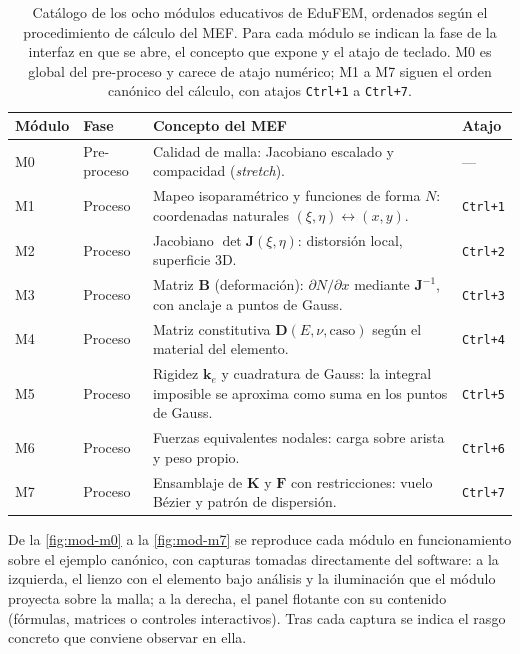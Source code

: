 \begin{table}[htbp]
\centering
\caption[Catálogo de los ocho módulos educativos de EduFEM.]{Catálogo de los ocho módulos educativos de EduFEM, ordenados según el procedimiento de cálculo del MEF. Para cada módulo se indican la fase de la interfaz en que se abre, el concepto que expone y el atajo de teclado. M0 es global del pre-proceso y carece de atajo numérico; M1 a M7 siguen el orden canónico del cálculo, con atajos \texttt{Ctrl+1} a \texttt{Ctrl+7}.}
\label{tab:modulos-edu}
\begin{tabular}{l l p{6.2cm} l}
\toprule
\textbf{Módulo} & \textbf{Fase} & \textbf{Concepto del MEF} & \textbf{Atajo} \\
\midrule
M0 & Pre-proceso  & Calidad de malla: Jacobiano escalado y compacidad (\emph{stretch}). & --- \\
M1 & Proceso      & Mapeo isoparamétrico y funciones de forma $N$: coordenadas naturales $(\xi,\eta) \leftrightarrow (x,y)$. & \texttt{Ctrl+1} \\
M2 & Proceso      & Jacobiano $\det\bm{J}(\xi,\eta)$: distorsión local, superficie 3D. & \texttt{Ctrl+2} \\
M3 & Proceso      & Matriz $\bm{B}$ (deformación): $\partial N/\partial x$ mediante $\bm{J}^{-1}$, con anclaje a puntos de Gauss. & \texttt{Ctrl+3} \\
M4 & Proceso      & Matriz constitutiva $\bm{D}(E,\nu,\text{caso})$ según el material del elemento. & \texttt{Ctrl+4} \\
M5 & Proceso      & Rigidez $\bm{k}_e$ y cuadratura de Gauss: la integral imposible se aproxima como suma en los puntos de Gauss. & \texttt{Ctrl+5} \\
M6 & Proceso      & Fuerzas equivalentes nodales: carga sobre arista y peso propio. & \texttt{Ctrl+6} \\
M7 & Proceso      & Ensamblaje de $\bm{K}$ y $\bm{F}$ con restricciones: vuelo Bézier y patrón de dispersión. & \texttt{Ctrl+7} \\
\bottomrule
\end{tabular}
\end{table}


De la \autoref{fig:mod-m0} a la \autoref{fig:mod-m7} se reproduce cada módulo en funcionamiento sobre el ejemplo canónico, con capturas tomadas directamente del software: a la izquierda, el lienzo con el elemento bajo análisis y la iluminación que el módulo proyecta sobre la malla; a la derecha, el panel flotante con su contenido (fórmulas, matrices o controles interactivos). Tras cada captura se indica el rasgo concreto que conviene observar en ella.

